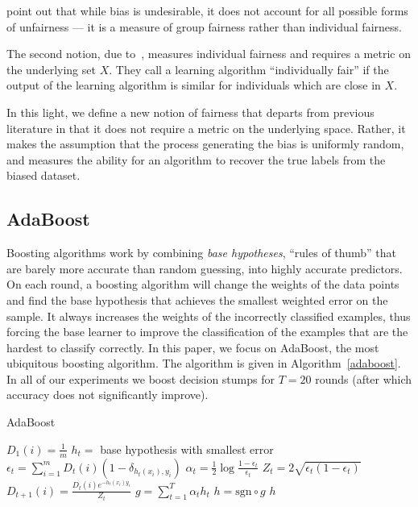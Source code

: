 \documentclass{article}
\begin{document}
\citet{DworkHPR12} point out that while bias is undesirable, it does not account
for all possible forms of unfairness --- it is a measure of group fairness
rather than individual fairness.

The second notion, due to~\citet{DworkHPR12},
measures individual fairness and requires a metric on the underlying set $X$.
They call a learning algorithm ``individually fair'' if the output of the
learning algorithm is similar for individuals which are close in $X$. 

In this light, we define a new notion of fairness that departs from
previous literature in that it does not require a metric on the underlying
space. Rather, it makes the assumption that the process generating the bias is
uniformly random, and measures the ability for an algorithm to recover the true
labels from the biased dataset.

\subsection{AdaBoost}

Boosting algorithms work by combining \emph{base hypotheses}, ``rules of thumb'' that
are barely more accurate than random guessing, into highly accurate predictors.
On each round, a boosting algorithm will change the weights of the data points
and find the base hypothesis that achieves the smallest weighted error on the sample.
It always increases the weights of the incorrectly classified examples, thus forcing
the base learner to improve the classification of the examples that are the hardest
to classify correctly. In this paper, we focus on AdaBoost, the most ubiquitous 
boosting algorithm. The algorithm is given in Algorithm~\ref{adaboost}. In all
of our experiments we boost decision stumps for $T=20$ rounds
(after which accuracy does not significantly improve).

\begin{algorithm}
\caption{AdaBoost \citep{FreundS97}}
\begin{algorithmic}\label{adaboost}
\STATE $D_1(i) = \frac1m$
\ENDFOR
{}
\STATE $h_t = $ base hypothesis with smallest error
\STATE $\epsilon_t = \sum_{i=1}^m D_t(i) (1-\delta_{h_t(x_i), y_i})$
\STATE $\alpha_t = \frac12\log\frac{1-\epsilon_t}{\epsilon_t}$
\STATE $Z_t = 2\sqrt{\epsilon_t (1-\epsilon_t)}$
\STATE $ D_{t+1}(i) = \frac{D_t(i) e^{-h_t(x_i) y_i}}{Z_t}$
\ENDFOR
\ENDFOR
\STATE $g=\sum_{t=1}^T \alpha_t h_t$
\STATE $h = \mathrm{sgn}\circ g$
\RETURN $h$
\end{algorithmic}
\end{algorithm}
\end{document}
